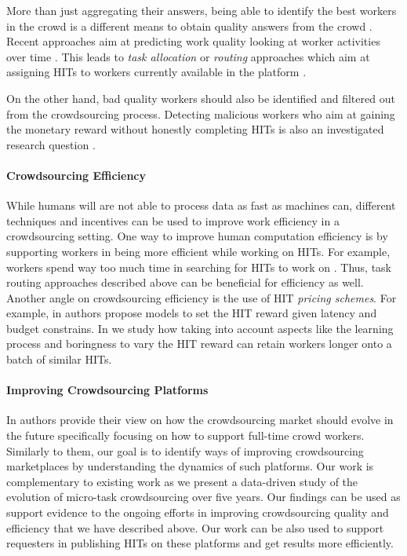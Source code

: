 More than just aggregating their answers,  being able to identify the best workers in the crowd is a different  means to obtain quality answers from the crowd \cite{pickacrowd,bozzon}. 
% 
Recent approaches aim at predicting work quality looking at worker activities over time  \cite{Jung14-hcomp}.
% 
This leads to \emph{task allocation} or \emph{routing} approaches which aim at assigning HITs to  workers currently available in the platform \cite{goel2014mechanism,crowdstar}.

On the other hand, bad quality workers should also be identified and filtered out from the crowdsourcing process.
Detecting malicious workers who aim at gaining the monetary reward without honestly  completing HITs is also an investigated research question \cite{collusion}.






\paragraph{Crowdsourcing Efficiency}
While humans will are not able to process data as fast as machines can, different techniques and incentives can be used to improve work efficiency in a crowdsourcing setting.
% 
One way to improve human computation efficiency is by supporting workers in being more efficient while working on HITs. For example, workers spend way too much time in searching for HITs to work on \cite{Kucherbaev:2014:TET:2598153.2602249}. Thus, task routing approaches described above can be beneficial for efficiency as well.
% 
Another angle on crowdsourcing efficiency is the use of HIT \emph{pricing schemes}. For example, in \cite{finishthem} authors propose models to set the HIT reward given latency and budget constrains. In \cite{scaleup} we study how taking into account aspects like the learning process and boringness  to vary the HIT reward can retain workers longer onto a batch of similar HITs.






\paragraph{Improving Crowdsourcing Platforms}
In \cite{Kittur:2013:FCW:2441776.2441923} authors provide their view on how the crowdsourcing market should evolve in the future specifically focusing on how to  support full-time crowd workers. Similarly to them, our goal is to identify ways of improving crowdsourcing marketplaces by understanding the dynamics of such platforms.
Our work is complementary to existing work as we present a data-driven study of the evolution of micro-task crowdsourcing over five years.
Our findings can be used as support evidence to the ongoing efforts in improving crowdsourcing quality and efficiency that we have described above.
Our work can be also used to support requesters in publishing HITs on these platforms and get results more efficiently.




